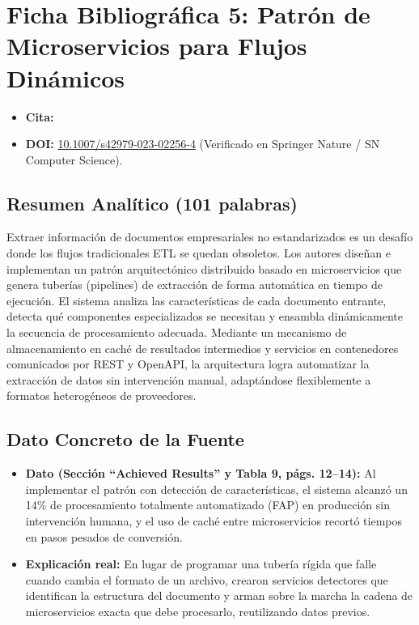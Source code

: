 \documentclass[11pt,a4paper]{article}
\begin{document}
\newpage

\section{Ficha Bibliográfica 5: Patrón de Microservicios para Flujos Dinámicos}

\begin{itemize}[leftmargin=1.2em]
    \item \textbf{Cita:} 
    \item \textbf{DOI:} \href{https://doi.org/10.1007/s42979-023-02256-4}{10.1007/s42979-023-02256-4} (Verificado en Springer Nature / SN Computer Science).
\end{itemize}

\subsection*{Resumen Analítico (101 palabras)}
Extraer información de documentos empresariales no estandarizados es un desafío donde los flujos tradicionales ETL se quedan obsoletos. Los autores diseñan e implementan un patrón arquitectónico distribuido basado en microservicios que genera tuberías (pipelines) de extracción de forma automática en tiempo de ejecución. El sistema analiza las características de cada documento entrante, detecta qué componentes especializados se necesitan y ensambla dinámicamente la secuencia de procesamiento adecuada. Mediante un mecanismo de almacenamiento en caché de resultados intermedios y servicios en contenedores comunicados por REST y OpenAPI, la arquitectura logra automatizar la extracción de datos sin intervención manual, adaptándose flexiblemente a formatos heterogéneos de proveedores.

\subsection*{Dato Concreto de la Fuente}
\begin{itemize}[leftmargin=1.2em]
    \item \textbf{Dato (Sección ``Achieved Results'' y Tabla 9, págs. 12--14):} Al implementar el patrón con detección de características, el sistema alcanzó un 14\% de procesamiento totalmente automatizado (FAP) en producción sin intervención humana, y el uso de caché entre microservicios recortó tiempos en pasos pesados de conversión.
    \item \textbf{Explicación real:} En lugar de programar una tubería rígida que falle cuando cambia el formato de un archivo, crearon servicios detectores que identifican la estructura del documento y arman sobre la marcha la cadena de microservicios exacta que debe procesarlo, reutilizando datos previos.
\end{itemize}
\end{document}
